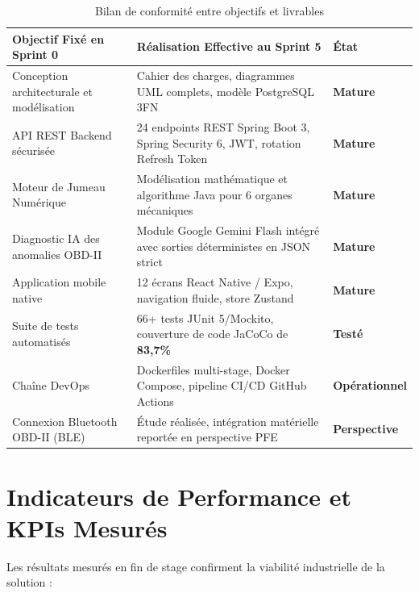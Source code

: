\documentclass[12pt,a4paper,oneside]{report}
\begin{document}
\begin{table}[H]
\centering
\small
\begin{tabularx}{\textwidth}{p{4.2cm} X p{2.2cm}}
\toprule
\textbf{Objectif Fix\'e en Sprint 0} & \textbf{R\'ealisation Effective au Sprint 5} & \textbf{\'Etat} \\
\midrule
Conception architecturale et mod\'elisation & Cahier des charges, diagrammes UML complets, mod\`ele PostgreSQL 3FN & \textcolor{green!50!black}{\textbf{Mature}} \\
\addlinespace
API REST Backend s\'ecuris\'ee & 24 endpoints REST Spring Boot 3, Spring Security 6, JWT, rotation Refresh Token & \textcolor{green!50!black}{\textbf{Mature}} \\
\addlinespace
Moteur de Jumeau Num\'erique & Mod\'elisation math\'ematique et algorithme Java pour 6 organes m\'ecaniques & \textcolor{green!50!black}{\textbf{Mature}} \\
\addlinespace
Diagnostic IA des anomalies OBD-II & Module Google Gemini Flash int\'egr\'e avec sorties d\'eterministes en JSON strict & \textcolor{green!50!black}{\textbf{Mature}} \\
\addlinespace
Application mobile native & 12 \'ecrans React Native / Expo, navigation fluide, store Zustand & \textcolor{green!50!black}{\textbf{Mature}} \\
\addlinespace
Suite de tests automatis\'es & 66+ tests JUnit 5/Mockito, couverture de code JaCoCo de \textbf{83,7\%} & \textcolor{green!50!black}{\textbf{Test\'e}} \\
\addlinespace
Cha\^ine DevOps & Dockerfiles multi-stage, Docker Compose, pipeline CI/CD GitHub Actions & \textcolor{green!50!black}{\textbf{Op\'erationnel}} \\
\addlinespace
Connexion Bluetooth OBD-II (BLE) & \'Etude r\'ealis\'ee, int\'egration mat\'erielle report\'ee en perspective PFE & \textcolor{accentOrange}{\textbf{Perspective}} \\
\bottomrule
\end{tabularx}
\caption{Bilan de conformit\'e entre objectifs et livrables}
\label{tab:bilan_ch6}
\end{table}

\section{Indicateurs de Performance et KPIs Mesur\'es}
Les r\'esultats mesur\'es en fin de stage confirment la viabilit\'e industrielle de la solution :
\end{document}
